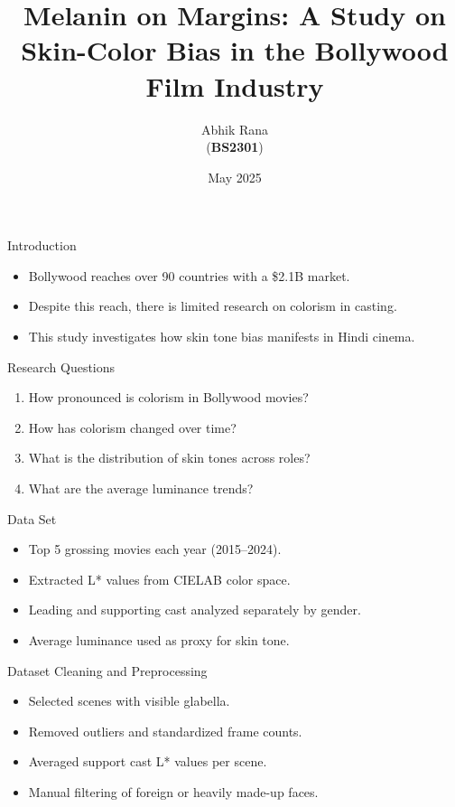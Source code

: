 \documentclass{beamer}
\title[MELANIN ON MARGINS]{Melanin on Margins: A Study on Skin-Color Bias in the Bollywood Film Industry}
\author{Abhik Rana\\ (\textbf{BS2301})}
\date{May 2025}
\begin{document}
\begin{frame}
    \titlepage
\end{frame}

\begin{frame}{Introduction}
    \begin{itemize}
        \item Bollywood reaches over 90 countries with a \$2.1B market.
        \item Despite this reach, there is limited research on colorism in casting.
        \item This study investigates how skin tone bias manifests in Hindi cinema.
    \end{itemize}
\end{frame}

\begin{frame}{Research Questions}
  \begin{enumerate}
    \item How pronounced is colorism in Bollywood movies?
    \item How has colorism changed over time?
    \item What is the distribution of skin tones across roles?
    \item What are the average luminance trends?
  \end{enumerate}
\end{frame}

\begin{frame}{Data Set}
  \begin{itemize}
    \item Top 5 grossing movies each year (2015--2024).
    \item Extracted L* values from CIELAB color space.
    \item Leading and supporting cast analyzed separately by gender.
    \item Average luminance used as proxy for skin tone.
  \end{itemize}
\end{frame}

\begin{frame}{Dataset Cleaning and Preprocessing}
  \begin{itemize}
    \item Selected scenes with visible glabella.
    \item Removed outliers and standardized frame counts.
    \item Averaged support cast L* values per scene.
    \item Manual filtering of foreign or heavily made-up faces.
  \end{itemize}
\end{frame}
\end{document}
